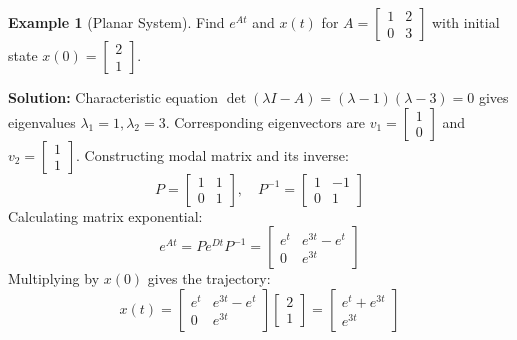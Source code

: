 \documentclass[12pt,a4paper,oneside]{article}
\theoremstyle{definition}
\newtheorem{example}{Example}[section]
\theoremstyle{plain}
\begin{document}
\begin{example}[Planar System]
Find $e^{At}$ and $x(t)$ for $A = \begin{bmatrix} 1 & 2 \\ 0 & 3 \end{bmatrix}$ with initial state $x(0) = \begin{bmatrix} 2 \\ 1 \end{bmatrix}$.

\textbf{Solution:}
Characteristic equation $\det(\lambda I - A) = (\lambda - 1)(\lambda - 3) = 0$ gives eigenvalues $\lambda_1 = 1, \lambda_2 = 3$.
Corresponding eigenvectors are $v_1 = \begin{bmatrix} 1 \\ 0 \end{bmatrix}$ and $v_2 = \begin{bmatrix} 1 \\ 1 \end{bmatrix}$.
Constructing modal matrix and its inverse:
\begin{equation}
    P = \begin{bmatrix} 1 & 1 \\ 0 & 1 \end{bmatrix}, \quad P^{-1} = \begin{bmatrix} 1 & -1 \\ 0 & 1 \end{bmatrix}
\end{equation}
Calculating matrix exponential:
\begin{equation}
    e^{At} = P e^{Dt} P^{-1} = \begin{bmatrix} e^t & e^{3t} - e^t \\ 0 & e^{3t} \end{bmatrix}
\end{equation}
Multiplying by $x(0)$ gives the trajectory:
\begin{equation}
    x(t) = \begin{bmatrix} e^t & e^{3t} - e^t \\ 0 & e^{3t} \end{bmatrix} \begin{bmatrix} 2 \\ 1 \end{bmatrix} = \begin{bmatrix} e^t + e^{3t} \\ e^{3t} \end{bmatrix}
\end{equation}
\end{example}
\end{document}
